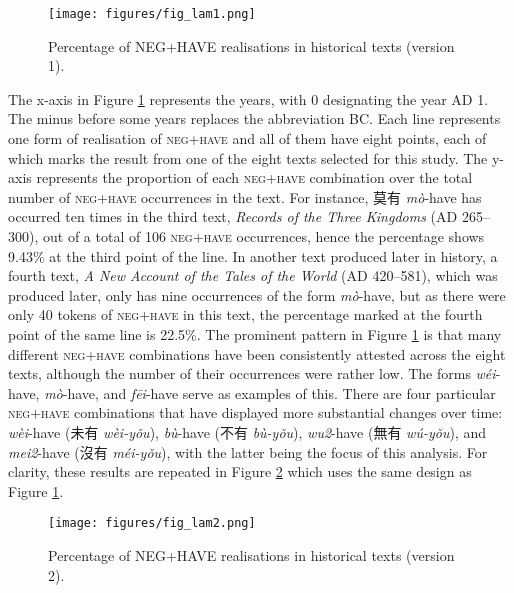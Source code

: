 \documentclass[output=paper]{langscibook}
\begin{document}
\begin{figure}
  \texttt{[image: figures/fig\_lam1.png]}
  \caption{Percentage of NEG+HAVE realisations in historical texts (version 1).}
  \label{fig:lam1}
\end{figure}

The x-axis in Figure \ref{fig:lam1} represents the years, with 0 designating the year AD 1. The minus before some years replaces the abbreviation BC. Each line represents one form of realisation of \textsc{neg}+\textsc{have} and all of them have eight points, each of which marks the result from one of the eight texts selected for this study. The y-axis represents the proportion of each \textsc{neg}+\textsc{have} combination over the total number of \textsc{neg}+\textsc{have} occurrences in the text. For instance, 莫有 \textit{mò}-have has occurred ten times in the third text, \emph{Records of the Three Kingdoms} (AD 265–300), out of a total of 106 \textsc{neg}+\textsc{have} occurrences, hence the percentage shows 9.43\% at the third point of the line. In another text produced later in history, a fourth text, \emph{A New Account of the Tales of the World} (AD 420–581), which was produced later, only has nine occurrences of the form \textit{mò}-have, but as there were only 40 tokens of \textsc{neg}+\textsc{have} in this text, the percentage marked at the fourth point of the same line is 22.5\%. The prominent pattern in Figure \ref{fig:lam1} is that many different \textsc{neg}+\textsc{have} combinations have been consistently attested across the eight texts, although the number of their occurrences were rather low. The forms \textit{wéi}-have, \textit{mò}-have, and \textit{fēi}-have serve as examples of this. There are four particular \textsc{neg}+\textsc{have} combinations that have displayed more substantial changes over time: \textit{wèi}-have (未有 \textit{wèi-yǒu}), \textit{bù}-have (不有 \textit{bù-yǒu}), \textit{wu2}-have (無有 \textit{wú-yǒu}), and \textit{mei2}-have (沒有 \textit{méi-yǒu}), with the latter being the focus of this analysis. For clarity, these results are repeated in Figure \ref{fig:lam2} which uses the same design as Figure \ref{fig:lam1}. 

\begin{figure}
  \texttt{[image: figures/fig\_lam2.png]}
  \caption{Percentage of NEG+HAVE realisations in historical texts (version 2).}
  \label{fig:lam2}
\end{figure}
\end{document}
